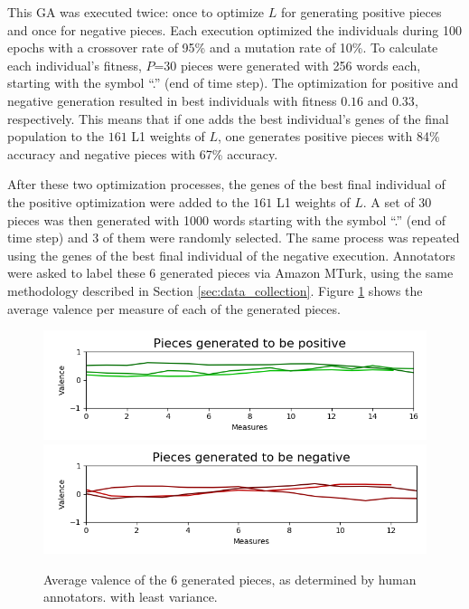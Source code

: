 This GA was executed twice: once to optimize $L$ for generating positive pieces and once for negative pieces. Each execution optimized the individuals during 100 epochs with a crossover rate of 95\% and a mutation rate of 10\%. To calculate each individual's fitness, $P$=30 pieces were generated with 256 words each, starting with the symbol ``.'' (end of time step). The optimization for positive and negative generation resulted in best individuals with fitness $0.16$ and $0.33$, respectively. This means that if one adds the best individual's genes of the final population to the $161$ L1 weights of $L$, one generates positive pieces with 84\% accuracy and negative pieces with 67\% accuracy.

After these two optimization processes, the genes of the best final individual of the positive optimization were added to the $161$ L1 weights of $L$. A set of 30 pieces was then generated with 1000 words starting with the symbol ``.'' (end of time step) and 3 of them were randomly selected. The same process was repeated using the genes of the best final individual of the negative execution. Annotators were asked to label these 6 generated pieces via Amazon MTurk, using the same methodology described in Section \ref{sec:data_collection}. Figure \ref{fig:generated_eval} shows the average valence per measure of each of the generated pieces.

\begin{figure}[!h]
 \includegraphics[width=0.9\columnwidth]{imgs/ismir19/means_pos.png}
 \includegraphics[width=0.9\columnwidth]{imgs/ismir19/means_neg.png}
 \caption{Average valence of the 6 generated pieces, as determined by human annotators.
 with least variance.}
 \label{fig:generated_eval}
\end{figure}


